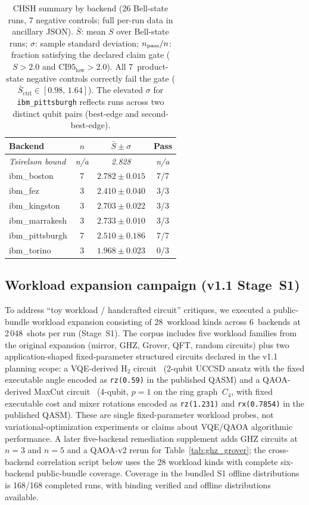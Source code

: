 \documentclass[aps,prxquantum,twocolumn,superscriptaddress,amsmath,amssymb,longbibliography,floatfix]{revtex4-2}
\begin{document}
\begin{table}[tbp]
\caption{CHSH summary by backend (26 Bell-state runs, 7 negative controls; full per-run data in ancillary JSON). $\bar{S}$: mean $S$ over Bell-state runs; $\sigma$: sample standard deviation; $n_{\rm pass}/n$: fraction satisfying the declared claim gate ($S > 2.0$ and $\mathrm{CI95_{low}} > 2.0$). All 7~product-state negative controls correctly fail the gate ($\bar{S}_{\mathrm{ctrl}} \in [0.98,\, 1.64]$). The elevated $\sigma$ for \texttt{ibm\_pittsburgh} reflects runs across two distinct qubit pairs (best-edge and second-best-edge).}
\label{tab:chsh_runs}
\begin{ruledtabular}
\begin{tabular}{lccc}
Backend & $n$ & $\bar{S} \pm \sigma$ & Pass \\
\hline
\textit{Tsirelson bound} & \textit{n/a} & \textit{2.828} & \textit{n/a} \\
\hline
ibm\_boston     & 7 & $2.782 \pm 0.015$ & 7/7 \\
ibm\_fez       & 3 & $2.410 \pm 0.040$ & 3/3 \\
ibm\_kingston  & 3 & $2.703 \pm 0.022$ & 3/3 \\
ibm\_marrakesh & 3 & $2.733 \pm 0.010$ & 3/3 \\
ibm\_pittsburgh& 7 & $2.510 \pm 0.186$ & 7/7 \\
ibm\_torino    & 3 & $1.968 \pm 0.023$ & 0/3 \\
\end{tabular}
\end{ruledtabular}
\end{table}

\subsection{Workload expansion campaign (v1.1 Stage~S1)}
\label{sec:v11}

To address ``toy workload / handcrafted circuit'' critiques, we executed a public-bundle workload expansion consisting of 28~workload kinds across 6~backends at 2\,048~shots per run (Stage~S1). The corpus includes five workload families from the original expansion (mirror, GHZ, Grover, QFT, random circuits) plus two application-shaped fixed-parameter structured circuits declared in the v1.1 planning scope: a VQE-derived H$_2$ circuit~\cite{Peruzzo2014} (2-qubit UCCSD ansatz with the fixed executable angle encoded as \texttt{rz(0.59)} in the published QASM) and a QAOA-derived MaxCut circuit~\cite{Farhi2014} (4-qubit, $p{=}1$ on the ring graph~$C_4$, with fixed executable cost and mixer rotations encoded as \texttt{rz(1.231)} and \texttt{rx(0.7854)} in the published QASM). These are single fixed-parameter workload probes, not variational-optimization experiments or claims about VQE/QAOA algorithmic performance. A later five-backend remediation supplement adds GHZ circuits at $n{=}3$ and $n{=}5$ and a QAOA-v2 rerun for Table~\ref{tab:ghz_grover}; the cross-backend correlation script below uses the 28 workload kinds with complete six-backend public-bundle coverage. Coverage in the bundled S1 offline distributions is 168/168 completed runs, with binding verified and offline distributions available.
\end{document}

